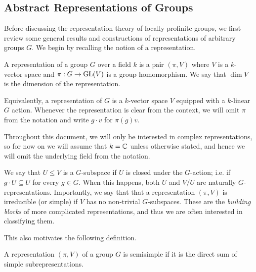 \subsection{Abstract Representations of Groups} \label{Abstract_Reps}
Before discussing the representation theory of locally profinite groups, we first review some general results and constructions of representations of arbitrary groups $G$. We begin by recalling the notion of a representation.

\begin{defn}
    A representation of a group $G$ over a field $k$ is a pair $(\pi,V)$ where $V$ is a $k$-vector space and $\pi:G\rightarrow\mathrm{GL}(V)$ is a group homomorphism. We say that $\dim V$ is the dimension of the representation.
\end{defn}

Equivalently, a representation of $G$ is a $k$-vector space $V$ equipped with a $k$-linear $G$ action. Whenever the representation is clear from the context, we will omit $\pi$ from the notation and write $g\cdot v$ for $\pi(g)v$. 

Throughout this document, we will only be interested in complex representations, so for now on we will assume that $k=\mathbb{C}$ unless otherwise stated, and hence we will omit the underlying field from the notation.

We say that $U\leq V$ is a $G$-subspace if $U$ is closed under the $G$-action; i.e. if $g\cdot U\subseteq U$ for every $g\in G$. When this happens, both $U$ and $V/U$ are naturally $G$-representations. Importantly, we say that that a representation $(\pi,V)$ is irreducible (or simple) if $V$ has no non-trivial $G$-subspaces. These are the \textit{building blocks} of more complicated representations, and thus we are often interested in classifying them.

This also motivates the following definition.

\begin{defn}
    A representation $(\pi,V)$ of a group $G$ is semisimple if it is the direct sum of simple subrepresentations. 
\end{defn}

